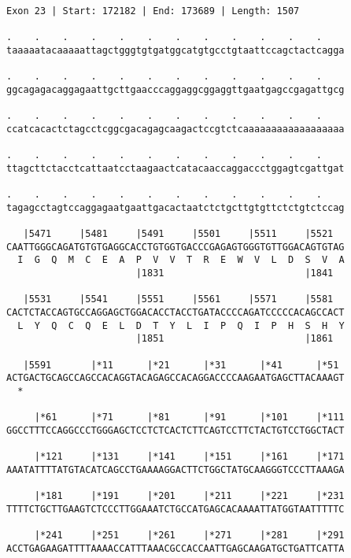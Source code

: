 \documentclass{article}
\begin{document}
\begin{Verbatim}[fontfamily=courier]
Exon 23 | Start: 172182 | End: 173689 | Length: 1507

.    .    .    .    .    .    .    .    .    .    .    .    
taaaaatacaaaaattagctgggtgtgatggcatgtgcctgtaattccagctactcagga

.    .    .    .    .    .    .    .    .    .    .    .    
ggcagagacaggagaattgcttgaacccaggaggcggaggttgaatgagccgagattgcg

.    .    .    .    .    .    .    .    .    .    .    .    
ccatcacactctagcctcggcgacagagcaagactccgtctcaaaaaaaaaaaaaaaaaa

.    .    .    .    .    .    .    .    .    .    .    .    
ttagcttctacctcattaatcctaagaactcatacaaccaggaccctggagtcgattgat

.    .    .    .    .    .    .    .    .    .    .    .    
tagagcctagtccaggagaatgaattgacactaatctctgcttgtgttctctgtctccag

   |5471     |5481     |5491     |5501     |5511     |5521  
CAATTGGGCAGATGTGTGAGGCACCTGTGGTGACCCGAGAGTGGGTGTTGGACAGTGTAG
  I  G  Q  M  C  E  A  P  V  V  T  R  E  W  V  L  D  S  V  A
                       |1831                         |1841  

   |5531     |5541     |5551     |5561     |5571     |5581  
CACTCTACCAGTGCCAGGAGCTGGACACCTACCTGATACCCCAGATCCCCCACAGCCACT
  L  Y  Q  C  Q  E  L  D  T  Y  L  I  P  Q  I  P  H  S  H  Y
                       |1851                         |1861  

   |5591       |*11      |*21      |*31      |*41      |*51 
ACTGACTGCAGCCAGCCACAGGTACAGAGCCACAGGACCCCAAGAATGAGCTTACAAAGT
  *   

     |*61      |*71      |*81      |*91      |*101     |*111
GGCCTTTCCAGGCCCTGGGAGCTCCTCTCACTCTTCAGTCCTTCTACTGTCCTGGCTACT

     |*121     |*131     |*141     |*151     |*161     |*171
AAATATTTTATGTACATCAGCCTGAAAAGGACTTCTGGCTATGCAAGGGTCCCTTAAAGA

     |*181     |*191     |*201     |*211     |*221     |*231
TTTTCTGCTTGAAGTCTCCCTTGGAAATCTGCCATGAGCACAAAATTATGGTAATTTTTC

     |*241     |*251     |*261     |*271     |*281     |*291
ACCTGAGAAGATTTTAAAACCATTTAAACGCCACCAATTGAGCAAGATGCTGATTCATTA

\end{Verbatim}
\newpage
\end{document}

